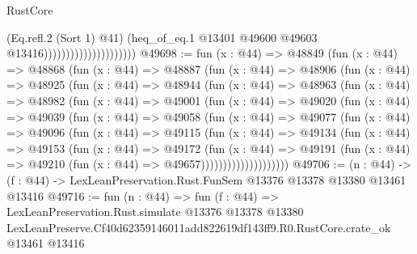 \begin{lexlean}{RustCore}
\begin{coremodule}
                                            (Eq.refl.{2} (Sort 1) @41)
                                            (heq_of_eq.{1}
                                              @13401
                                              @49600
                                              @49603
                                              @13416)))))))))))))))))))))
@49698 := fun (x : @44) =>
  @48849
    (fun (x : @44) =>
    @48868
      (fun (x : @44) =>
      @48887
        (fun (x : @44) =>
        @48906
          (fun (x : @44) =>
          @48925
            (fun (x : @44) =>
            @48944
              (fun (x : @44) =>
              @48963
                (fun (x : @44) =>
                @48982
                  (fun (x : @44) =>
                  @49001
                    (fun (x : @44) =>
                    @49020
                      (fun (x : @44) =>
                      @49039
                        (fun (x : @44) =>
                        @49058
                          (fun (x : @44) =>
                          @49077
                            (fun (x : @44) =>
                            @49096
                              (fun (x : @44) =>
                              @49115
                                (fun (x : @44) =>
                                @49134
                                  (fun (x : @44) =>
                                  @49153
                                    (fun (x : @44) =>
                                    @49172
                                      (fun (x : @44) =>
                                      @49191
                                        (fun (x : @44) =>
                                        @49210 (fun (x : @44) => @49657))))))))))))))))))))
@49706 := (n : @44) ->
  (f : @44) -> LexLeanPreservation.Rust.FunSem @13376 @13378 @13380 @13461 @13416
@49716 := fun (n : @44) =>
  fun (f : @44) =>
  LexLeanPreservation.Rust.simulate
    @13376
    @13378
    @13380
    LexLeanPreserve.Cf40d62359146011add822619df143ff9.R0.RustCore.crate_ok
    @13461
    @13416
\end{coremodule}
\end{lexlean}
